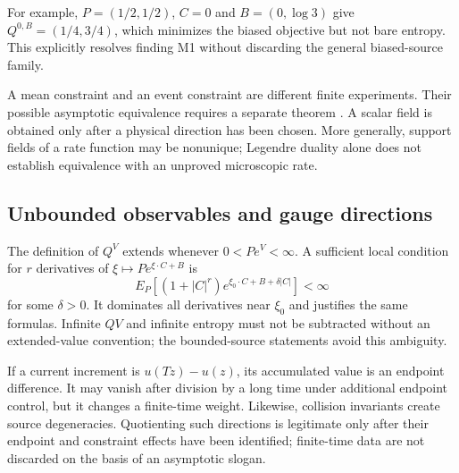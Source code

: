 For example, $P=(1/2,1/2)$, $C=0$ and $B=(0,\log3)$ give $Q^{0,B}=(1/4,3/4)$, which minimizes the biased objective but not bare entropy. This explicitly resolves finding M1 without discarding the general biased-source family.

A mean constraint and an event constraint are different finite experiments. Their possible asymptotic equivalence requires a separate theorem \cite{ChetriteTouchette}. A scalar field is obtained only after a physical direction has been chosen. More generally, support fields of a rate function may be nonunique; Legendre duality alone does not establish equivalence with an unproved microscopic rate.

\subsection{Unbounded observables and gauge directions}
The definition of $Q^V$ extends whenever $0<Pe^V<\infty$. A sufficient local condition for $r$ derivatives of $\xi\mapsto Pe^{\xi\cdot C+B}$ is
\[
 E_P[(1+|C|^r)e^{\xi_0\cdot C+B+\delta|C|}]<\infty
\]
for some $\delta>0$. It dominates all derivatives near $\xi_0$ and justifies the same formulas. Infinite $QV$ and infinite entropy must not be subtracted without an extended-value convention; the bounded-source statements avoid this ambiguity.

If a current increment is $u(Tz)-u(z)$, its accumulated value is an endpoint difference. It may vanish after division by a long time under additional endpoint control, but it changes a finite-time weight. Likewise, collision invariants create source degeneracies. Quotienting such directions is legitimate only after their endpoint and constraint effects have been identified; finite-time data are not discarded on the basis of an asymptotic slogan.
\par
